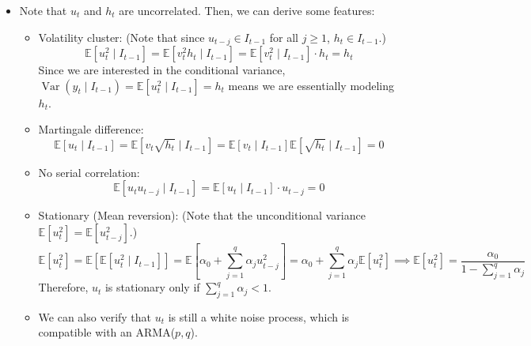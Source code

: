 \documentclass[notitlepage]{article}
\DeclareMathOperator{\Var}{Var}
\begin{document}
\begin{itemize}
    \[
    u_t = v_t\sqrt{h_t}, \;h_t = \alpha_0 + \sum_{j=1}^q \alpha_j u_{t-j}^2
    \]
    where \(\mathbb{E}[v_t \mid I_{t-1}]=0\) and \(\mathbb{E}[v_t^2 \mid I_{t-1}]=1\). For example, we can assume \(v_t \overset{\text{i.i.d.}}{\sim} \mathcal{N}(0,1)\).
    \item Note that \(u_t\) and \(h_t\) are uncorrelated. Then, we can derive some features:
    \begin{itemize}
        \item Volatility cluster: (Note that since \(u_{t-j} \in I_{t-1}\) for all \(j\ge1\), \(h_t \in I_{t-1}\).)
        \[
        \mathbb{E}[u_t^2 \mid I_{t-1}] = \mathbb{E}[v_t^2 h_t \mid I_{t-1}] = \mathbb{E}[v_t^2 \mid I_{t-1}] \cdot h_t = h_t
        \]
        Since we are interested in the conditional variance, \(\Var(y_t \mid I_{t-1}) = \mathbb{E}[u_t^2 \mid I_{t-1}] = h_t\) means we are essentially modeling \(h_t\).
        \item Martingale difference:
        \[
            \mathbb{E}[u_t \mid I_{t-1}] = \mathbb{E}[v_t\sqrt{h_t} \mid I_{t-1}] = \mathbb{E}[v_t \mid I_{t-1}] \mathbb{E}[\sqrt{h_t} \mid I_{t-1}] = 0
        \]
        \item No serial correlation:
        \[
            \mathbb{E}[u_tu_{t-j} \mid I_{t-1}] = \mathbb{E}[u_t \mid I_{t-1}] \cdot u_{t-j} = 0 
        \]
        \item Stationary (Mean reversion): (Note that the unconditional variance \(\mathbb{E}[u_t^2] = \mathbb{E}[u_{t-j}^2]\).)
        \[
            \mathbb{E}[u_t^2] = \mathbb{E}[\mathbb{E}[u_t^2 \mid I_{t-1}]] = \mathbb{E}[\alpha_0 + \sum_{j=1}^q \alpha_j u_{t-j}^2] = \alpha_0 + \sum_{j=1}^q \alpha_j \mathbb{E}[u_t^2] \implies \mathbb{E}[u_t^2] = \frac{\alpha_0}{1 - \sum_{j=1}^q \alpha_j}
        \]
        Therefore, \(u_t\) is stationary only if \(\sum_{j=1}^q \alpha_j < 1\).
        \item We can also verify that \(u_t\) is still a white noise process, which is compatible with an ARMA(\(p,q\)).
    \end{itemize}


\end{itemize}
\end{document}
